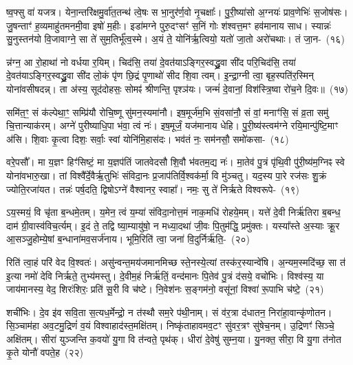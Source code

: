 ष्व॒फ्सु वा॑ यजत्र। येना॒न्तरि॑क्षमु॒र्वा॑त॒तन्थ॑ त्वे॒षः स भा॒नुर॑र्ण॒वो नृ॒चक्षाः᳚। पु॒री॒ष्या॑सो अ॒ग्नयः॑ प्राव॒णेभिः॑ स॒जोष॑सः। जु॒षन्ताꣳ॑ ह॒व्यमाहु॑तमनमी॒वा इषो॑ म॒हीः। इडा॑मग्ने पुरु॒दꣳसꣳ॑ स॒निं गोः श॑श्वत्त॒मꣳ हव॑मानाय साध। स्यान्नः॑ सु॒नुस्तन॑यो वि॒जावाग्ने॒ सा ते॑ सुम॒तिर्भू᳚त्व॒स्मे। अ॒यं ते॒ योनि॑र्\mbox{}ऋ॒त्वियो॒ यतो॑ जा॒तो अरो॑चथाः। तं जा॒न-~(१६)

न्न॑ग्न॒ आ रो॒हाथा॑ नो वर्धया र॒यिम्। चिद॑सि॒ तया॑ दे॒वत॑या\-ऽ\-ङ्गिर॒स्वद्ध्रु॒वा सी॑द परि॒चिद॑सि॒ तया॑ दे॒वत॑या\-ऽङ्गिर॒स्वद्ध्रु॒वा सी॑द लो॒कं पृ॑ण छि॒द्रं पृ॒णाथो॑ सीद शि॒वा त्वम्। इ॒न्द्रा॒ग्नी त्वा॒ बृह॒स्पति॑र॒स्मिन् योना॑वसीषदन्न्। ता अ॑स्य॒ सूद॑दोहसः॒ सोमꣴ॑ श्रीणन्ति॒ पृश्ञ॑यः। जन्मं॑ दे॒वानां॒ विश॑स्त्रि॒ष्वा रो॑च॒ने दि॒वः॥~(१७)

{\anuvakamend[{अ॒स्त्वोष॑धीषु जा॒नन्न॒ष्टाच॑त्वारिꣳशच्च}]}%

समि॑त॒ꣳ॒ सं क॑ल्पेथा॒ꣳ॒ सम्प्रि॑यौ रोचि॒ष्णू सु॑मन॒स्यमा॑नौ। इष॒मूर्ज॑म॒भि सं॒वसा॑नौ॒ सं वां॒ मनाꣳ॑सि॒ सं व्र॒ता समु॑ चि॒त्तान्याक॑रम्। अग्ने॑ पुरीष्याधि॒पा भ॑वा॒ त्वं नः॑। इष॒मूर्जं॒ यज॑मानाय धेहि। पु॒री॒ष्य॑स्त्वम॑ग्ने रयि॒मान्पु॑ष्टि॒माꣳ अ॑सि। शि॒वाः कृ॒त्वा दिशः॒ सर्वाः॒ स्वां योनि॑मि॒हास॑दः। भव॑तं नः॒ सम॑नसौ॒ समो॑कसा-~(१८)

वरे॒पसौ᳚। मा य॒ज्ञꣳ हिꣳ॑सिष्टं॒ मा य॒ज्ञप॑तिं जातवेदसौ शि॒वौ भ॑वतम॒द्य नः॑। मा॒तेव॑ पु॒त्रं पृ॑थि॒वी पु॑री॒ष्य॑म॒ग्निꣴ स्वे योना॑वभारु॒खा। तां विश्वै᳚र्दे॒वैर्\mbox{}ऋ॒तुभिः॑ संविदा॒नः प्र॒जा\-प॑तिर्वि॒श्वक॑र्मा॒ वि मु॑ञ्चतु। यद॒स्य पा॒रे रज॑सः शु॒क्रं ज्योति॒रजा॑यत। तन्नः॑ पर्\mbox{}ष॒दति॒ द्विषो\-ऽग्ने॑ वैश्वानर॒ स्वाहा᳚। नमः॒ सु ते॑ निर्\mbox{}ऋते विश्वरूपे-~(१९)

ऽय॒स्मयं॒ वि चृ॑ता ब॒न्धमे॒तम्। य॒मेन॒ त्वं य॒म्या॑ संविदा॒नोत्त॒मं नाक॒मधि॑ रोहये॒मम्। यत्ते॑ दे॒वी निर्\mbox{}ऋ॑तिरा ब॒बन्ध॒ दाम॑ ग्री॒वास्व॑विच॒र्त्यम्। इ॒दं ते॒ तद्वि ष्या॒म्यायु॑षो॒ न मध्या॒दथा॑ जी॒वः पि॒तुम॑द्धि॒ प्रमु॑क्तः। यस्या᳚स्ते अ॒स्याः क्रू॒र आ॒सञ्जु॒होम्ये॒षां ब॒न्धाना॑मव॒सर्ज॑नाय। भूमि॒रिति॑ त्वा॒ जना॑ वि॒दुर्निर्\mbox{}ऋ॑ति॒-~(२०)

रिति॑ त्वा॒हं परि॑ वेद वि॒श्वतः॑। असु॑न्वन्त॒मय॑जमानमिच्छ स्ते॒नस्ये॒त्यां तस्क॑र॒स्यान्वे॑षि। अ॒न्यम॒स्मदि॑च्छ॒ सा त॑ इ॒त्या नमो॑ देवि निर्\mbox{}ऋते॒ तुभ्य॑मस्तु। दे॒वीम॒हं निर्\mbox{}ऋ॑तिं॒ वन्द॑मानः पि॒तेव॑ पु॒त्रं द॑सये॒ वचो॑भिः। विश्व॑स्य॒ या जाय॑मानस्य॒ वेद॒ शिरः॑शिरः॒ प्रति॑ सू॒री वि च॑ष्टे। नि॒वेश॑नः स॒ङ्गम॑नो॒ वसू॑नां॒ विश्वा॑ रू॒पाभि च॑ष्टे॒~(२१)

शची॑भिः। दे॒व इ॑व सवि॒ता स॒त्यध॒र्मेन्द्रो॒ न त॑स्थौ सम॒रे प॑थी॒नाम्। सं व॑र॒त्रा द॑धातन॒ निरा॑हा॒वान्कृ॑णोतन। सि॒ञ्चाम॑हा अव॒टमु॒द्रिणं॑ व॒यं विश्वाहाद॑स्त॒मक्षि॑तम्। निष्कृ॑ताहावमव॒टꣳ सु॑वर॒त्रꣳ सु॑षेच॒नम्। उ॒द्रिणꣳ॑ सिञ्चे॒ अक्षि॑तम्। सीरा॑ युञ्जन्ति क॒वयो॑ यु॒गा वि त॑न्वते॒ पृथ॑क्। धीरा॑ दे॒वेषु॑ सुम्न॒या। यु॒नक्त॒ सीरा॒ वि यु॒गा त॑नोत कृ॒ते योनौ॑ वपते॒ह~(२२)

